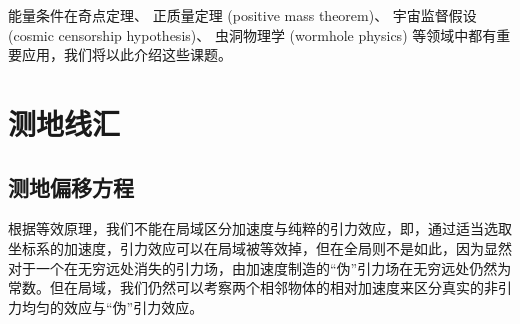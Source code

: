 \documentclass[hyperref, UTF8, a4paper]{ctexart}
\begin{document}
能量条件在奇点定理、 正质量定理 (positive mass theorem)、 宇宙监督假设 (cosmic censorship hypothesis)、 虫洞物理学 (wormhole physics) 等领域中都有重要应用，我们将以此介绍这些课题。

\section{测地线汇}%
\subsection{测地偏移方程}
根据等效原理，我们不能在局域区分加速度与纯粹的引力效应，即，通过适当选取坐标系的加速度，引力效应可以在局域被等效掉，但在全局则不是如此，因为显然对于一个在无穷远处消失的引力场，由加速度制造的“伪”引力场在无穷远处仍然为常数。但在局域，我们仍然可以考察两个相邻物体的相对加速度来区分真实的非引力均匀的效应与“伪”引力效应。
\end{document}

